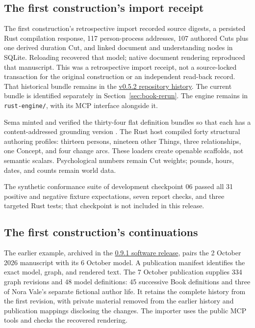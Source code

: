 \documentclass[11pt,a4paper]{article}
\begin{document}
\subsection{The first construction's import receipt}

The first construction's retrospective import recorded source digests, a
persisted Rust compilation response, 117 person-process addresses, 107 authored Cuts plus one derived
duration Cut, and linked document and understanding nodes in SQLite. Reloading
recovered that model; native document rendering reproduced that manuscript.
This was a retrospective import receipt, not a source-locked transaction for
the original construction or an independent read-back record.
That historical bundle remains in the
\href{https://github.com/emergent-wisdom/meaning-model/tree/v0.5.2/examples/book-of-conditions}{v0.5.2 repository history}.
The current bundle is identified separately in Section~\ref{sec:book-rerun}. The engine remains in
\texttt{rust-engine/}, with its MCP interface alongside it.

Sema minted and verified the thirty-four flat definition bundles so that each
has a content-addressed grounding version \cite{westerbergSema2026}. The Rust
host compiled forty structural authoring profiles: thirteen persons, nineteen
other Things, three relationships, one Concept, and four change arcs. These
loaders create openable scaffolds, not semantic scalars. Psychological numbers
remain Cut weights; pounds, hours, dates, and counts remain world data.

The synthetic conformance suite of development checkpoint 06 passed all 31
positive and negative fixture expectations, seven report checks, and three
targeted Rust tests; that checkpoint is not included in this release.

\subsection{The first construction's continuations}
\label{app:continuations}

The earlier example, archived in the
\href{https://github.com/emergent-wisdom/meaning-model/tree/v0.9.1/examples/book-of-conditions}{0.9.1 software release},
pairs the 2 October 2026 manuscript with its 6 October model. A publication
manifest identifies the exact model, graph, and rendered text. The 7 October
publication supplies 334 graph revisions and 48 model definitions: 45
successive Book definitions and three of Nora Vale's separate fictional
author life. It retains the complete history from the first revision, with
private material removed from the earlier history and publication mappings
disclosing the changes. The importer uses the public MCP tools and checks the
recovered rendering.
\end{document}
